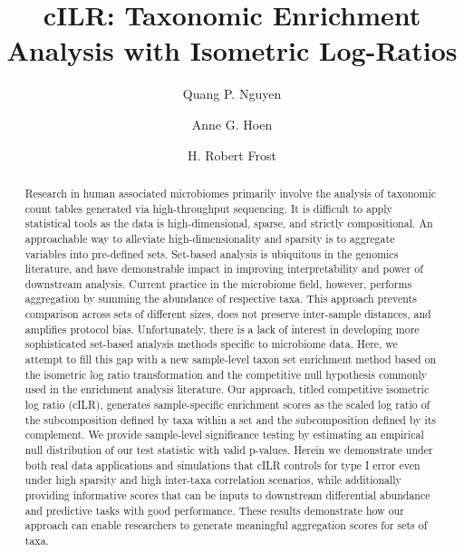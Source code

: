 \documentclass{article}
\title{cILR: Taxonomic Enrichment Analysis with Isometric Log-Ratios}
\author[1,2]{Quang P. Nguyen}
\author[1,2]{Anne G. Hoen}
\author[1]{H. Robert Frost}
\affil[1]{Department of Biomedical Data Science, Geisel School of Medicine at Dartmouth College, Hanover, NH, USA}
\affil[2]{Department of Epidemiology, Geisel School of Medicine at Dartmouth College, Hanover, NH, USA}
\date{}                     %
\begin{document}
\maketitle
{}

\begin{abstract}
    \noindent Research in human associated microbiomes primarily involve the analysis of taxonomic count tables generated via high-throughput sequencing. It is difficult to apply statistical tools as the data is high-dimensional, sparse, and strictly compositional. An approachable way to alleviate high-dimensionality and sparsity is to aggregate variables into pre-defined sets. Set-based analysis is ubiquitous in the genomics literature, and have demonstrable impact in improving interpretability and power of downstream analysis. Current practice in the microbiome field, however, performs aggregation by summing the abundance of respective taxa. This approach prevents comparison across sets of different sizes, does not preserve inter-sample distances, and amplifies protocol bias. Unfortunately, there is a lack of interest in developing more sophisticated set-based analysis methods specific to microbiome data. Here, we attempt to fill this gap with a new sample-level taxon set enrichment method based on the isometric log ratio transformation and the competitive null hypothesis commonly used in the enrichment analysis literature. Our approach, titled competitive isometric log ratio (cILR), generates sample-specific enrichment scores as the scaled log ratio of the subcomposition defined by taxa within a set and the subcomposition defined by its complement. We provide sample-level significance testing by estimating an empirical null distribution of our test statistic with valid p-values. Herein we demonstrate under both real data applications and simulations that cILR controls for type I error even under high sparsity and high inter-taxa correlation scenarios, while additionally providing informative scores that can be inputs to downstream differential abundance and predictive tasks with good performance. These results demonstrate how our approach can enable researchers to generate meaningful aggregation scores for sets of taxa. 
\end{abstract}
\end{document}

